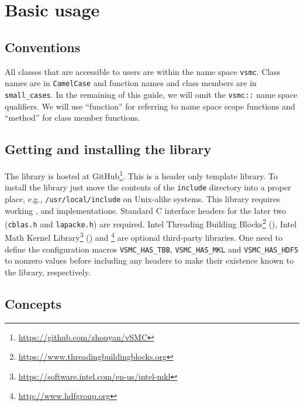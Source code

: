 \chapter{Basic usage}
\label{chap:Basic usage}

\section{Conventions}
\label{sec:Conventions}

All classes that are accessible to users are within the name space \verb|vsmc|.
Class names are in \verb|CamelCase| and function names and class members are in
\verb|small_cases|. In the remaining of this guide, we will omit the
\verb|vsmc::| name space qualifiers. We will use ``function'' for referring to
name space scope functions and ``method'' for class member functions.

\section{Getting and installing the library}
\label{sec:Getting and installing the library}

The library is hosted at
GitHub\footnote{\url{https://github.com/zhouyan/vSMC}}. This is a header only
\cpp template library. To install the library just move the contents of the
\verb|include| directory into a proper place, e.g.,
\verb|/usr/local/include| on Unix-alike systems. This library requires
working \cppoo, \blas and \lapack implementations. Standard C interface headers
for the later two (\verb|cblas.h| and \verb|lapacke.h|) are required. Intel
Threading Building
Blocks\footnote{\url{https://www.threadingbuildingblocks.org}} (\tbb), Intel
Math Kernel Library\footnote{\url{https://software.intel.com/en-us/intel-mkl}}
(\mkl) and \hdf\footnote{\url{http://www.hdfgroup.org}} are optional
third-party libraries. One need to define the configuration macros
\verb|VSMC_HAS_TBB|, \verb|VSMC_HAS_MKL| and \verb|VSMC_HAS_HDF5| to nonzero
values before including any \vsmc headers to make their existence known to the
library, respectively.

\section{Concepts}
\label{sec:Concepts}

